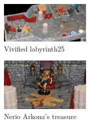 \begin{figure}[h]
	\centering
	\includegraphics[width=0.39\textwidth]{images/Vivified-labyrinth25-565301156.jpg}
	\caption{Vivified labyrinth25}
	\label{fig:Vivified-labyrinth25-565301156}
\end{figure}

\begin{figure}[h]
	\centering
	\includegraphics[width=0.39\textwidth]{images/Nerio-Arkona-s-treasure-565301563.jpg}
	\caption{Nerio Arkona's treasure}
	\label{fig:Nerio-Arkona-s-treasure-565301563}
\end{figure}

